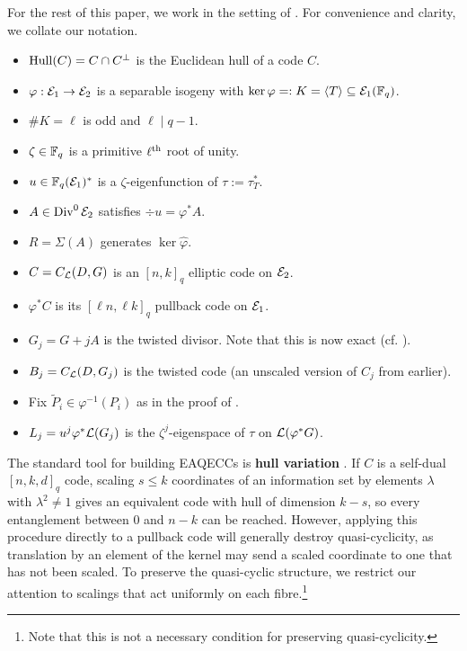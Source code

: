 \documentclass[twocolumn, 11pt]{scrartcl}
\begin{document}
For the rest of this paper, we work in the setting of . For convenience and clarity, we collate our notation.
\begin{itemize}
    \item $\operatorname{Hull}(C)=C\cap C^\perp$ is the Euclidean hull of a code $C$.
    \item $\varphi:\mathcal{E}_1\to\mathcal{E}_2$ is a separable isogeny with $\ker\varphi=:K=\langle T\rangle \subseteq\mathcal{E}_1(\mathbb{F}_q)$.
    \item $\#K=\ell$ is odd and $\ell\mid q-1$.
    \item $\zeta\in\mathbb{F}_q$ is a primitive $\ell^\text{th}$ root of unity.
    \item $u\in\mathbb{F}_q(\mathcal{E}_1)^*$ is a $\zeta$-eigenfunction of $\tau:=\tau_T^*$.
    \item $A\in\operatorname{Div}^0\mathcal{E}_2$ satisfies $\div u=\varphi^* A$.
    \item $R=\Sigma(A)$ generates $\ker\hat\varphi$.
    \item $C=C_\mathcal{L}(D,G)$ is an $[n,k]_q$ elliptic code on $\mathcal{E}_2$.
    \item $\varphi^*C$ is its $[\ell n,\ell k]_q$ pullback code on $\mathcal{E}_1$.
    \item $G_j=G+jA$ is the twisted divisor. Note that this is now exact (cf. ).
    \item $B_j=C_\mathcal{L}(D,G_j)$ is the twisted code (an unscaled version of $C_j$ from earlier).
    \item Fix $\tilde P_i\in\varphi^{-1}(P_i)$ as in the proof of .
    \item $L_j=u^j\varphi^*\mathcal{L}(G_j)$ is the $\zeta^j$-eigenspace of $\tau$ on $\mathcal{L}(\varphi^*G)$.
\end{itemize}

The standard tool for building EAQECCs is \textbf{hull variation} \cite{chen2023hullvariation,luo2024variable}. If $C$ is a self-dual $[n,k,d]_q$ code, scaling $s\leq k$ coordinates of an information set by elements $\lambda$ with $\lambda^2\neq1$ gives an equivalent code with hull of dimension $k-s$, so every entanglement between $0$ and $n-k$ can be reached. However, applying this procedure directly to a pullback code will generally destroy quasi-cyclicity, as translation by an element of the kernel may send a scaled coordinate to one that has not been scaled. To preserve the quasi-cyclic structure, we restrict our attention to scalings that act uniformly on each fibre.\footnote{Note that this is not a necessary condition for preserving quasi-cyclicity.}
\end{document}
